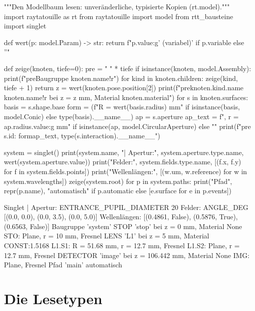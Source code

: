 \documentclass[11pt,a4paper,openany]{book}
\DeclareRobustCommand{\code}[1]{\texttt{\directlua{rttcode("\luaescapestring{\detokenize{#1}}")}}}
\begin{document}
\begin{pycode}[title={\code{ex03_modell_lesen.py}}]
"""Den Modellbaum lesen: unveränderliche, typisierte Kopien (rt.model)."""
import raytatouille as rt
from raytatouille import model
from rtt_bausteine import singlet


def wert(p: model.Param) -> str:
    return f"{p.value:g}{' (variabel)' if p.variable else ''}"


def zeige(knoten, tiefe=0):
    pre = "  " * tiefe
    if isinstance(knoten, model.Assembly):
        print(f"{pre}Baugruppe {knoten.name!r}")
        for kind in knoten.children:
            zeige(kind, tiefe + 1)
        return
    z = wert(knoten.pose.position[2])
    print(f"{pre}{knoten.kind.name} {knoten.name!r} bei z = {z} mm, Material {knoten.material}")
    for s in knoten.surfaces:
        basis = s.shape.base
        form = (f"R = {wert(basis.radius)} mm" if isinstance(basis, model.Conic)
                else type(basis).__name__)
        ap = s.aperture
        ap_text = f", r = {ap.radius.value:g} mm" if isinstance(ap, model.CircularAperture) else ""
        print(f"{pre}  {s.id}: {form}{ap_text}, {type(s.interaction).__name__}")


system = singlet()
print(system.name, "| Apertur:", system.aperture.type.name, wert(system.aperture.value))
print("Felder:", system.fields.type.name, [(f.x, f.y) for f in system.fields.points])
print("Wellenlängen:", [(w.um, w.reference) for w in system.wavelengths])
zeige(system.root)
for p in system.paths:
    print("Pfad", repr(p.name), "automatisch" if p.automatic else [e.surface for e in p.events])
\end{pycode}
\begin{ausgabe}
Singlet | Apertur: ENTRANCE_PUPIL_DIAMETER 20
Felder: ANGLE_DEG [(0.0, 0.0), (0.0, 3.5), (0.0, 5.0)]
Wellenlängen: [(0.4861, False), (0.5876, True), (0.6563, False)]
Baugruppe 'system'
  STOP 'stop' bei z = 0 mm, Material None
    STO: Plane, r = 10 mm, Fresnel
  LENS 'L1' bei z = 5 mm, Material CONST:1.5168
    L1.S1: R = 51.68 mm, r = 12.7 mm, Fresnel
    L1.S2: Plane, r = 12.7 mm, Fresnel
  DETECTOR 'image' bei z = 106.442 mm, Material None
    IMG: Plane, Fresnel
Pfad 'main' automatisch
\end{ausgabe}

\section{Die Lesetypen}
\end{document}
